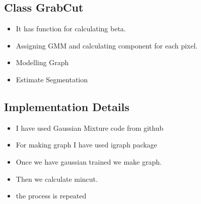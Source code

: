 \documentclass[11pt]{article}
\providecommand{\tightlist}{%
      \setlength{\itemsep}{0pt}\setlength{\parskip}{0pt}}
\begin{document}
    \hypertarget{class-grabcut}{%
\subsection{Class GrabCut}\label{class-grabcut}}

\begin{itemize}
\tightlist
\item
  It has function for calculating beta.
\item
  Assigning GMM and calculating component for each pixel.
\item
  Modelling Graph
\item
  Estimate Segmentation
\end{itemize}

    \hypertarget{implementation-details}{%
\subsection{Implementation Details}\label{implementation-details}}

\begin{itemize}
\tightlist
\item
  I have used Gaussian Mixture code from github
\item
  For making graph I have used igraph package
\item
  Once we have gaussian trained we make graph.
\item
  Then we calculate mincut.
\item
  the process is repeated
\end{itemize}
\end{document}
